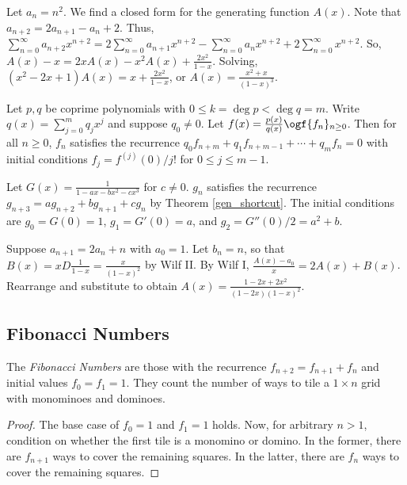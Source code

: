 \documentclass[a4paper]{article}
\begin{document}
\begin{example}\label{nsqgen}
Let $a_n=n^2$. We find a closed form for the generating function $A(x)$. Note that $a_{n+2}=2a_{n+1}-a_{n}+2$. Thus, $\sum_{n=0}^\infty a_{n+2}x^{n+2}=2\sum_{n=0}^\infty a_{n+1}x^{n+2}-\sum_{n=0}^\infty a_nx^{n+2}+2\sum_{n=0}^\infty x^{n+2}$. So, $A(x)-x=2xA(x)-x^2A(x)+\frac{2x^2}{1-x}$. Solving, $(x^2-2x+1)A(x)=x+\frac{2x^2}{1-x}$, or $A(x)=\frac{x^2+x}{(1-x)^3}$.
\end{example}

\begin{theorem}\label{gen_shortcut}
Let $p,q$ be coprime polynomials with $0\leq k=\deg p<\deg q=m$. Write $q(x)=\sum_{j=0}^mq_jx^j$ and suppose $q_0\neq0$. Let $f(x)=\frac{p(x)}{q(x)}\ogf \{f_n\}_{n\geq0}$. Then for all $n\geq0$, $f_n$ satisfies the recurrence $q_0f_{n+m}+q_1f_{n+m-1}+\cdots+q_mf_n=0$ with initial conditions $f_j=f^{(j)}(0)/j!$ for $0\leq j\leq m-1$.
\end{theorem}

\begin{example}
Let $G(x)=\frac1{1-ax-bx^2-cx^3}$ for $c\neq0$. $g_n$ satisfies the recurrence $g_{n+3}=ag_{n+2}+bg_{n+1}+cg_n$ by Theorem \ref{gen_shortcut}. The initial conditions are $g_0=G(0)=1$, $g_1=G'(0)=a$, and $g_2=G''(0)/2=a^2+b$.
\end{example}

\begin{example}
Suppose $a_{n+1}=2a_n+n$ with $a_0=1$. Let $b_n=n$, so that $\displaystyle B(x)=xD\frac1{1-x}=\frac x{(1-x)^2}$ by Wilf II. By Wilf I, $\frac{A(x)-a_0}x=2A(x)+B(x)$. Rearrange and substitute to obtain $A(x)=\frac{1-2x+2x^2}{(1-2x)(1-x)^2}$.
\end{example}

\subsection{Fibonacci Numbers}

\begin{definition}
The \emph{Fibonacci Numbers} are those with the recurrence $f_{n+2}=f_{n+1}+f_n$ and initial values $f_0=f_1=1$. They count the number of ways to tile a $1\times n$ grid with monominoes and dominoes.

\begin{hl}
\begin{proof}
The base case of $f_0=1$ and $f_1=1$ holds. Now, for arbitrary $n>1$, condition on whether the first tile is a monomino or domino. In the former, there are $f_{n+1}$ ways to cover the remaining squares. In the latter, there are $f_n$ ways to cover the remaining squares.
\end{proof}
\end{hl}
\end{definition}
\end{document}
